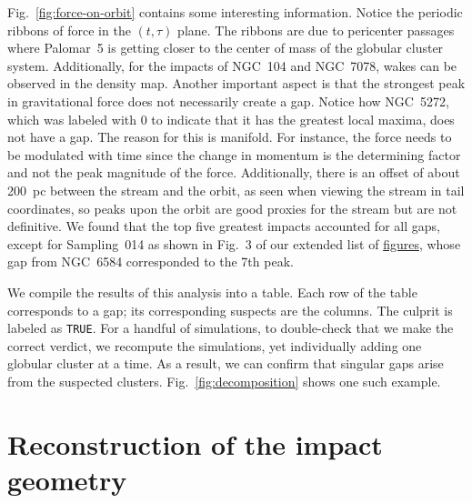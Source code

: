 \documentclass{aa}
\begin{document}
\begin{appendix}
    Fig.~\ref{fig:force-on-orbit} contains some interesting information. Notice the periodic ribbons of force in the $(t,\tau)$ plane. The ribbons are due to pericenter passages where Palomar~5 is getting closer to the center of mass of the globular cluster system. Additionally, for the impacts of NGC~104 and NGC~7078, wakes can be observed in the density map. Another important aspect is that the strongest peak in gravitational force does not necessarily create a gap. Notice how NGC~5272, which was labeled with 0 to indicate that it has the greatest local maxima, does not have a gap. The reason for this is manifold. For instance, the force needs to be modulated with time since the change in momentum is the determining factor and not the peak magnitude of the force.  Additionally, there is an offset of about 200~pc between the stream and the orbit, as seen when viewing the stream in tail coordinates, so peaks upon the orbit are good proxies for the stream but are not definitive. We found that the top five greatest impacts accounted for all gaps, except for Sampling~014 as shown in Fig.~3 of our extended list of  \href{10.5281/zenodo.15528089}{figures}, whose gap from NGC~6584 corresponded to the 7th peak. 

    We compile the results of this analysis into a table. Each row of the table corresponds to a gap; its corresponding suspects are the columns. The culprit is labeled as \texttt{TRUE}. For a handful of simulations, to double-check that we make the correct verdict, we recompute the simulations, yet individually adding one globular cluster at a time. As a result, we can confirm that singular gaps arise from the suspected clusters. Fig.~\ref{fig:decomposition} shows one such example. 



    \section{Reconstruction of the impact geometry} \label{sec:reconstruction}


\end{appendix}
\end{document}

